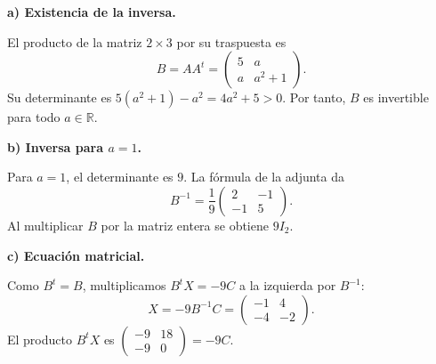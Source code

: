 \textbf{a) Existencia de la inversa.}\par\nopagebreak[4]
El producto de la matriz $2\times3$ por su traspuesta es
\[
B=AA^t=\begin{pmatrix}5&a\\a&a^2+1\end{pmatrix}.
\]
Su determinante es $5(a^2+1)-a^2=4a^2+5>0$. Por tanto, $B$ es invertible para todo $a\in\mathbb R$.

\textbf{b) Inversa para $a=1$.}\par\nopagebreak[4]
Para $a=1$, el determinante es $9$. La fórmula de la adjunta da
\[
\boxed{B^{-1}=\frac19\begin{pmatrix}2&-1\\-1&5\end{pmatrix}.}
\]
Al multiplicar $B$ por la matriz entera se obtiene $9I_2$.

\textbf{c) Ecuación matricial.}\par\nopagebreak[4]
Como $B^t=B$, multiplicamos $B^tX=-9C$ a la izquierda por $B^{-1}$:
\[
\boxed{X=-9B^{-1}C=\begin{pmatrix}-1&4\\-4&-2\end{pmatrix}.}
\]
El producto $B^tX$ es $\begin{pmatrix}-9&18\\-9&0\end{pmatrix}=-9C$.

